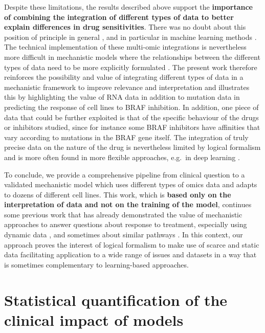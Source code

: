 \documentclass[a4paper,12pt,twoside,onecolumn,openright,final,oldfontcommands]{memoir}
\begin{document}
Despite these limitations, the results described above support the
\textbf{importance of combining the integration of different types of
data to better explain differences in drug sensitivities}. There was no
doubt about this position of principle in general
\citep{azuaje2017computational}, and in particular in machine learning
methods \citep{costello2014community, aben2016tandem}. The technical
implementation of these multi-omic integrations is nevertheless more
difficult in mechanistic models where the relationships between the
different types of data need to be more explicitly formulated
\citep{klinger2013network}. The present work therefore reinforces the
possibility and value of integrating different types of data in a
mechanistic framework to improve relevance and interpretation and
illustrates this by highlighting the value of RNA data in addition to
mutation data in predicting the response of cell lines to BRAF
inhibition. In addition, one piece of data that could be further
exploited is that of the specific behaviour of the drugs or inhibitors
studied, since for instance some BRAF inhibitors have affinities that
vary according to mutations in the BRAF gene itself. The integration of
truly precise data on the nature of the drug is nevertheless limited by
logical formalism and is more often found in more flexible approaches,
e.g.~in deep learning \citep{manica2019toward}.

To conclude, we provide a comprehensive pipeline from clinical question
to a validated mechanistic model which uses different types of omics
data and adapts to dozens of different cell lines. This work, which is
\textbf{based only on the interpretation of data and not on the training
of the model}, continues some previous work that has already
demonstrated the value of mechanistic approaches to answer questions
about response to treatment, especially using dynamic data
\citep{saez2020personalized}, and sometimes about similar pathways
\citep{klinger2013network}. In this context, our approach proves the
interest of logical formalism to make use of scarce and static data
facilitating application to a wide range of issues and datasets in a way
that is sometimes complementary to learning-based approaches.

\part{Statistical quantification of the clinical impact of
models}\label{part-statistical-quantification-of-the-clinical-impact-of-models}
\end{document}

